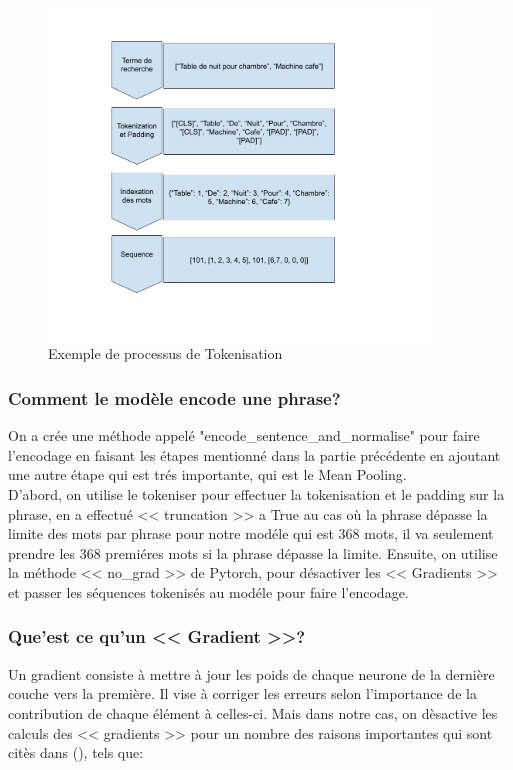 \begin{figure}[H]
	\centering
	\includegraphics[width=0.9\textwidth]{logos/tokenisation.png}
	\caption{Exemple de processus de Tokenisation}
	\label{fig:tokenisationexp}
\end{figure}

\subsubsection{Comment le modèle encode une phrase?}
\noindent
On a crée une méthode appelé "encode\_sentence\_and\_normalise" pour faire l'encodage en faisant les étapes mentionné dans la partie précédente en ajoutant une autre étape qui est trés importante, qui est le Mean Pooling. \\
D'abord, on utilise le tokeniser pour effectuer la tokenisation et le padding sur la phrase, en a effectué << truncation >> a True au cas où la phrase dépasse la limite des mots par phrase pour notre modéle qui est 368 mots, il va seulement prendre les 368 premiéres mots si la phrase dépasse la limite. Ensuite, on utilise la méthode << no\_grad >> de Pytorch, pour désactiver les << Gradients >> et passer les séquences tokenisés au modéle pour faire l'encodage.

\subsubsection{Que'est ce qu'un << Gradient >>?}
\noindent
Un gradient consiste à mettre à jour les poids de chaque neurone de la dernière couche vers la première. Il vise à corriger les erreurs selon l'importance de la contribution de chaque élément à celles-ci. Mais dans notre cas, on dèsactive les calculs des << gradients >> pour un nombre des raisons importantes qui sont citès dans  (\cite{pytorch:nograd}), tels que:


